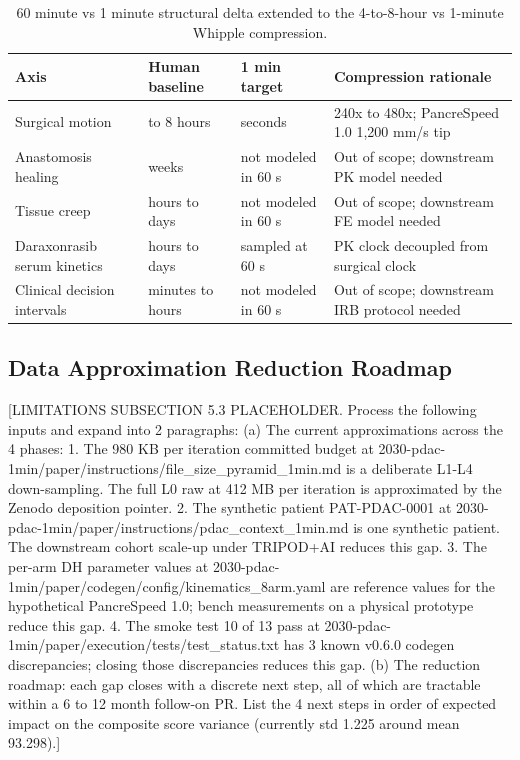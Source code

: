 \begin{table}[H]
\caption{60 minute vs 1 minute structural delta extended to the 4-to-8-hour vs 1-minute Whipple compression.}
\label{tab:limits-time}
\centering
\begin{tabular}{>{\raggedright\arraybackslash}p{3.0cm} >{\raggedright\arraybackslash}p{3.4cm} >{\raggedright\arraybackslash}p{3.4cm} >{\raggedright\arraybackslash}p{4.0cm}}
\toprule
\textbf{Axis} & \textbf{Human baseline} & \textbf{1 min target} & \textbf{Compression rationale} \\
\midrule
  Surgical motion & 4 to 8 hours & 60 seconds & 240x to 480x; PancreSpeed 1.0 1,200 mm/s tip \\
  Anastomosis healing & weeks & not modeled in 60 s & Out of scope; downstream PK model needed \\
  Tissue creep & hours to days & not modeled in 60 s & Out of scope; downstream FE model needed \\
  Daraxonrasib serum kinetics & hours to days & sampled at 60 s & PK clock decoupled from surgical clock \\
  Clinical decision intervals & minutes to hours & not modeled in 60 s & Out of scope; downstream IRB protocol needed \\
\bottomrule
\end{tabular}
\end{table}

\subsection{Data Approximation Reduction Roadmap}
\label{sec:limits-data}

[LIMITATIONS SUBSECTION 5.3 PLACEHOLDER. Process the following inputs and expand into 2 paragraphs:
(a) The current approximations across the 4 phases:
    1. The 980 KB per iteration committed budget at 2030-pdac-1min/paper/instructions/file_size_pyramid_1min.md is a deliberate L1-L4 down-sampling. The full L0 raw at 412 MB per iteration is approximated by the Zenodo deposition pointer.
    2. The synthetic patient PAT-PDAC-0001 at 2030-pdac-1min/paper/instructions/pdac_context_1min.md is one synthetic patient. The downstream cohort scale-up under TRIPOD+AI \cite{Collins2024TRIPODAI} reduces this gap.
    3. The per-arm DH parameter values at 2030-pdac-1min/paper/codegen/config/kinematics_8arm.yaml are reference values for the hypothetical PancreSpeed 1.0; bench measurements on a physical prototype reduce this gap.
    4. The smoke test 10 of 13 pass at 2030-pdac-1min/paper/execution/tests/test_status.txt has 3 known v0.6.0 codegen discrepancies; closing those discrepancies reduces this gap.
(b) The reduction roadmap: each gap closes with a discrete next step, all of which are tractable within a 6 to 12 month follow-on PR. List the 4 next steps in order of expected impact on the composite score variance (currently std 1.225 around mean 93.298).]


